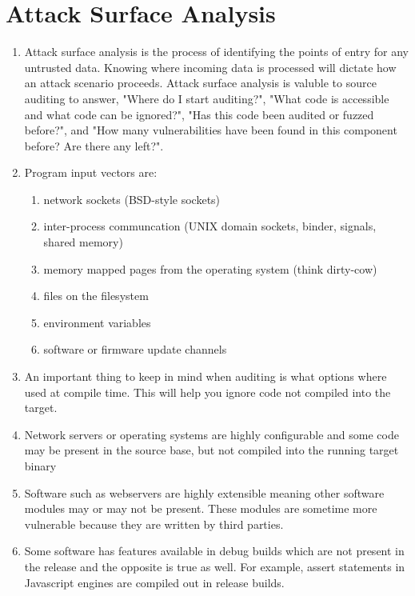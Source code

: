 \documentclass[12pt]{Training}
\begin{document}
\section*{Attack Surface Analysis}
\begin{enumerate}
	\item Attack surface analysis is the process of identifying the points of entry for any untrusted data. Knowing where incoming data is processed will dictate how an attack scenario proceeds. Attack surface analysis is valuble to source auditing to answer, "Where do I start auditing?", "What code is accessible and what code can be ignored?", "Has this code been audited or fuzzed before?", and "How many vulnerabilities have been found in this component before? Are there any left?".
	\item Program input vectors are:
 		\begin{enumerate}
			\item network sockets (BSD-style sockets)
			\item inter-process communcation (UNIX domain sockets, binder, signals, shared memory)
			\item memory mapped pages from the operating system (think dirty-cow)
			\item files on the filesystem
			\item environment variables
			\item software or firmware update channels
 		\end{enumerate}
	\item An important thing to keep in mind when auditing is what options where used at compile time. This will help you ignore code not compiled into the target.
	\item Network servers or operating systems are highly configurable and some code may be present in the source base, but not compiled into the running target binary
	\item Software such as webservers are highly extensible meaning other software modules may or may not be present. These modules are sometime more vulnerable because they are written by third parties.
	\item Some software has features available in debug builds which are not present in the release and the opposite is true as well. For example, assert statements in Javascript engines are compiled out in release builds.
\end{enumerate}

\end{document}
